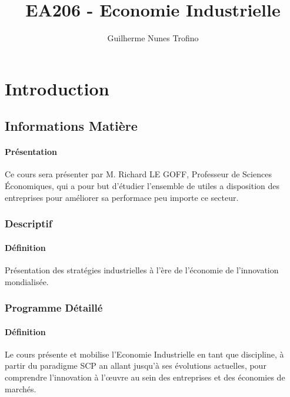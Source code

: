 \documentclass{article}
\title{EA206 - Economie Industrielle}
\author{Guilherme Nunes Trofino}
\begin{document}
\maketitle


\newpage\tableofcontents

\section{Introduction}

% 


\subsection{Informations Matière}
\paragraph{Présentation}Ce cours sera présenter par M. Richard LE GOFF, Professeur de Sciences Économiques, qui a pour but d'étudier l'ensemble de utiles a disposition des entreprises pour améliorer sa performace peu importe ce secteur.

\subsubsection{Descriptif}
\paragraph{Définition}Présentation des stratégies industrielles à l'ère de l'économie de l'innovation mondialisée.

\subsubsection{Programme Détaillé}
\paragraph{Définition}Le cours présente et mobilise l'Economie Industrielle en tant que discipline, à partir du paradigme SCP an allant jusqu'à ses évolutions actuelles, pour comprendre l'innovation à l'œuvre au sein des entreprises et des économies de marchés.\\
\end{document}
